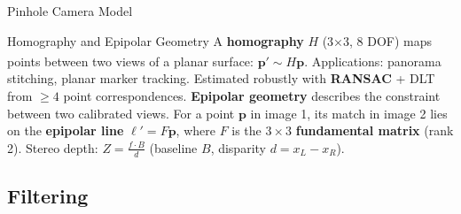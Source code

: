 \begin{v3topic}{Pinhole Camera Model}
\begin{center}
\label{fig:cv-pinhole}
    \end{center}

\end{v3topic}
\begin{v3topic}{Homography and Epipolar Geometry}
    A \textbf{homography} $H$ (3×3, 8 DOF) maps points between two views of a planar surface\textsuperscript{\cite[][pp.~32--36]{hartleyZisserman2004}}:
    $\mathbf{p}' \sim H\mathbf{p}$.
    Applications: panorama stitching, planar marker tracking.
    Estimated robustly with \textbf{RANSAC} + DLT from $\geq 4$ point correspondences.
\visualseparator
    \textbf{Epipolar geometry} describes the constraint between two calibrated views.
    For a point $\mathbf{p}$ in image 1, its match in image 2 lies on the
    \textbf{epipolar line} $\ell' = F\mathbf{p}$, where $F$ is the $3{\times}3$ \textbf{fundamental matrix} (rank 2).
    Stereo depth: $Z = \frac{f \cdot B}{d}$ (baseline $B$, disparity $d = x_L - x_R$).
\end{v3topic}

\subsection{Filtering}

